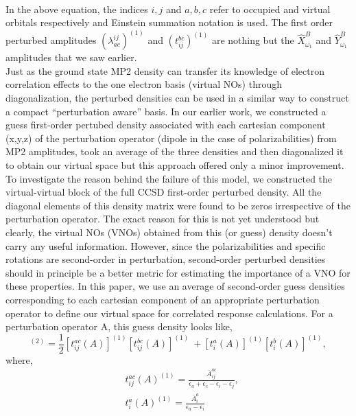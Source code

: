 \\
In the above equation, the indices $i,j$ and $a,b,c$ refer to occupied and virtual orbitals respectively
and Einstein summation notation is used. The first order perturbed amplitudes $(\lambda^{ij}_{ac})^{(1)}$ 
and $(t^{bc}_{ij})^{(1)}$ are nothing but the $\hat{X}^{B}_{\omega_1}$ and $\hat{Y}^{B}_{\omega_1}$ 
amplitudes that we saw earlier.\\ Just as the ground state MP2 density can transfer its knowledge of 
electron correlation effects to the one electron basis (virtual NOs) through diagonalization, 
the perturbed densities can be used in a similar way to construct a compact ``perturbation aware''
basis. In our earlier work, we constructed a guess first-order pertubed density associated  
with each cartesian component (x,y,z) of the perturbation operator (dipole in the case of polarizabilities)
from MP2 amplitudes, took an average of the three densities and then diagonalized it to obtain our 
virtual space but this approach offered only a minor improvement\cite{}.
To investigate the reason behind the failure of this model, we constructed the virtual-virtual
block of the full CCSD first-order perturbed density. All the diagonal elements of this density 
matrix were found to be zeros irrespective of the perturbation operator. The exact reason for this
is not yet understood but clearly, the virtual NOs (VNOs) obtained from this (or guess) density 
doesn't carry any useful information. However, since the polarizabilities and specific rotations are 
second-order in perturbation, second-order perturbed densities should in principle be a better 
metric for estimating the importance of a VNO for these properties.
In this paper, we use an average of second-order guess densities corresponding to each cartesian
component of an appropriate perturbation operator to define our virtual space 
for correlated response calculations. For a perturbation operator A, this guess density looks like,
\\
\begin{equation}
[{D^A_{ab}}]^{(2)} = \frac{1}{2}[t^{ac}_{ij}(A)]^{(1)}[t^{bc}_{ij}(A)]^{(1)} \
+ [t^{a}_{i}(A)]^{(1)} [t^{b}_{i}(A)]^{(1)}, 
\end{equation}
where,
\begin{equation}
\begin{split}
& t^{ac}_{ij}(A)^{(1)} = \frac{\bar{A}^{ac}_{ij}}{\epsilon_a + \epsilon_c - \epsilon_i - \epsilon_j},\\
& t^{a}_{i}(A)^{(1)} = \frac{\bar{A}^{a}_{i}}{\epsilon_a - \epsilon_i}\\
\end{split}
\end{equation}
